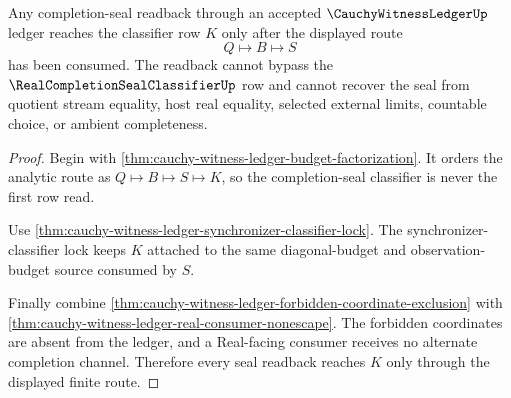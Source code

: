 \begin{theorem}
\label{thm:cauchy-witness-ledger-root-seal-readback}
Any completion-seal readback through an accepted $\CauchyWitnessLedgerUp$
ledger reaches the classifier row $K$ only after the displayed route
$$
Q \longmapsto B \longmapsto S
$$
has been consumed. The readback cannot bypass the
$\RealCompletionSealClassifierUp$ row and cannot recover the seal from quotient
stream equality, host real equality, selected external limits, countable
choice, or ambient completeness.
\end{theorem}
\begin{proof}
Begin with \autoref{thm:cauchy-witness-ledger-budget-factorization}. It orders
the analytic route as $Q \longmapsto B \longmapsto S \longmapsto K$, so the
completion-seal classifier is never the first row read.

Use \autoref{thm:cauchy-witness-ledger-synchronizer-classifier-lock}. The
synchronizer-classifier lock keeps $K$ attached to the same diagonal-budget and
observation-budget source consumed by $S$.

Finally combine \autoref{thm:cauchy-witness-ledger-forbidden-coordinate-exclusion}
with \autoref{thm:cauchy-witness-ledger-real-consumer-nonescape}. The forbidden
coordinates are absent from the ledger, and a Real-facing consumer receives no
alternate completion channel. Therefore every seal readback reaches $K$ only
through the displayed finite route.
\end{proof}

